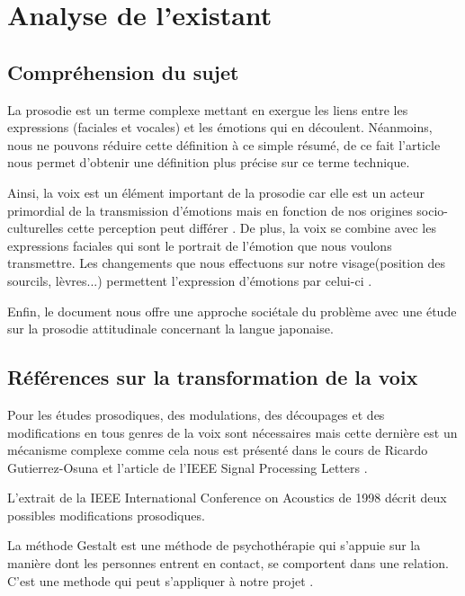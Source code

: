 \chapter{Analyse de l'existant}

\section{Compréhension du sujet}\label{comprehension_sujet}

La prosodie est un terme complexe mettant en exergue les liens entre les expressions (faciales et vocales) et les émotions qui en découlent. Néanmoins, nous ne pouvons réduire cette définition à ce simple résumé, de ce fait l'article \cite{bachorowski1999 vocaux} nous permet d'obtenir une définition plus précise sur ce terme technique.

Ainsi, la voix est un élément important de la prosodie car elle est un acteur primordial de la transmission d'émotions mais en fonction de nos origines socio-culturelles cette perception peut différer \cite{auberge2002prosodie}.
De plus, la voix se combine avec les expressions faciales qui sont le portrait de l'émotion que nous voulons transmettre. Les changements que nous effectuons sur notre visage(position des sourcils, lèvres...) permettent l'expression d'émotions par celui-ci \cite{ekman2003unmasking} .

Enfin, le document \cite{fourer:hal-00992083} nous offre une approche sociétale du problème avec une étude sur la prosodie attitudinale concernant la langue japonaise.


\section{Références sur la transformation de la voix}\label{ref_transfo_voix}

Pour les études prosodiques, des modulations, des découpages et des modifications en tous genres de la voix sont nécessaires mais cette dernière est un mécanisme complexe comme cela nous est présenté dans le cours de Ricardo Gutierrez-Osuna \cite{Gutierrez-Osuna:ISP-PMS} et l'article de l'IEEE Signal Processing Letters \cite{haagen1994transformation}.

L'extrait de la IEEE International Conference on Acoustics de 1998 \cite{Acero:ICASSP98-II-881} décrit deux possibles modifications prosodiques.

La méthode Gestalt est une méthode de psychothérapie qui s'appuie sur la manière dont les personnes entrent en contact, se comportent dans une relation. C'est une methode qui peut s'appliquer à notre projet \cite{auberge2002gestalt}.

